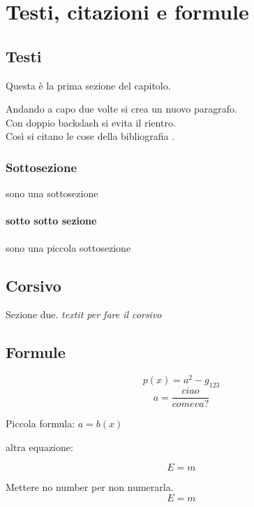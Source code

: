 \chapter{Testi, citazioni e formule}
\label{chap:testi}
\section{Testi}
Questa è la prima sezione del capitolo.

Andando a capo due volte si crea un nuovo paragrafo.
\\
Con doppio backslash si evita il rientro.
\\
Così si citano le cose della bibliografia \cite{realtime4} \cite{wikipedia}.

\subsection{Sottosezione}
sono una sottosezione
\subsubsection{sotto sotto sezione}
sono una piccola sottosezione

\section{Corsivo}
Sezione due. \textit{textit per fare il corsivo} 

\section{Formule}

\[p(x) = a^2 - g_{123}\]
\[a = \frac{ciao}{come va?}\]


Piccola formula: $a=b(x)$

altra equazione:

\begin{equation}
E=m
\end{equation}

Mettere no number per non numerarla.
\begin{equation}
E=m \nonumber
\end{equation}

